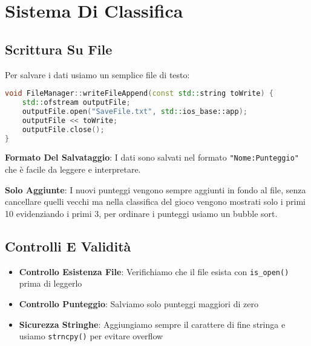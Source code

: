 \documentclass[a4paper,12pt]{article}
\begin{document}
\section{Sistema Di Classifica}

\subsection{Scrittura Su File}

Per salvare i dati usiamo un semplice file di testo:

\begin{lstlisting}[language=C++]
void FileManager::writeFileAppend(const std::string toWrite) {
    std::ofstream outputFile; 
    outputFile.open("SaveFile.txt", std::ios_base::app);
    outputFile << toWrite;
    outputFile.close();
}
\end{lstlisting}

\textbf{Formato Del Salvataggio}: I dati sono salvati nel formato \texttt{"Nome:Punteggio"} che è facile da leggere e interpretare.

\textbf{Solo Aggiunte}: I nuovi punteggi vengono sempre aggiunti in fondo al file, senza cancellare quelli vecchi ma nella classifica del gioco vengono mostrati solo i primi 10 evidenziando i primi 3, per ordinare i punteggi usiamo un bubble sort.

\subsection{Controlli E Validità}

\begin{itemize}
    \item \textbf{Controllo Esistenza File}: Verifichiamo che il file esista con \texttt{is\_open()} prima di leggerlo
    \item \textbf{Controllo Punteggio}: Salviamo solo punteggi maggiori di zero
    \item \textbf{Sicurezza Stringhe}: Aggiungiamo sempre il carattere di fine stringa e usiamo \texttt{strncpy()} per evitare overflow
\end{itemize}
\end{document}
